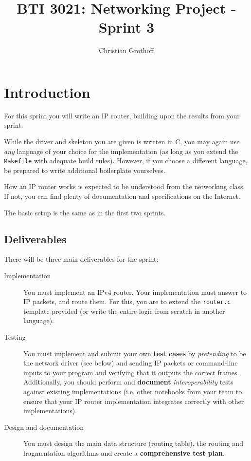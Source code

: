 \documentclass{article}
\title{BTI 3021: Networking Project - Sprint 3}
\author{Christian Grothoff}
\date{}
\begin{document}
\maketitle

\section{Introduction}

For this sprint you will write an IP router, building upon the
results from your sprint.

While the driver and skeleton you are given is written in C, you may
again use {\em any} language of your choice for the implementation (as
long as you extend the {\tt Makefile} with adequate build rules).
However, if you choose a different language, be prepared to write
additional boilerplate yourselves.

How an IP router works is expected to be understood from the
networking class. If not, you can find plenty of documentation and
specifications on the Internet.

The basic setup is the same as in the first two sprints.

\subsection{Deliverables}

There will be three main deliverables for the sprint:
\begin{description}
\item[Implementation] You must implement an IPv4 router. Your
  implementation must answer to IP packets, and route them.
  For this, you are to extend the {\tt router.c} template provided
  (or write the entire logic from scratch in another language).
\item[Testing] You must implement and submit your own {\bf test cases}
  by {\em pretending} to be the network driver (see below) and sending
  IP packets or command-line inputs to your program and verifying that it
  outputs the correct frames. Additionally, you should perform and
  {\bf document} {\em interoperability} tests against existing
  implementations (i.e. other notebooks from your team to ensure that
  your IP router implementation integrates correctly with other
  implementations).
\item[Design and documentation] You must design the main
  data structure (routing table), the routing and fragmentation algorithms
  and create a {\bf comprehensive test plan}.
\end{description}
\end{document}
